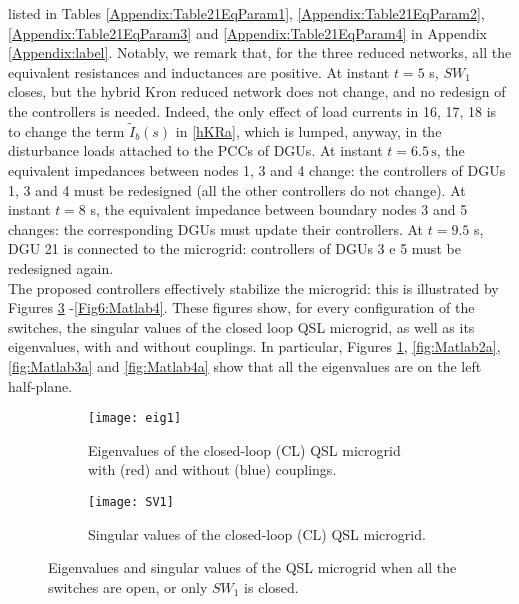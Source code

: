 \documentclass[a4paper]{article}
\theoremstyle{plain}
\begin{document}
listed in Tables \ref{Appendix:Table21EqParam1}, \ref{Appendix:Table21EqParam2}, \ref{Appendix:Table21EqParam3} and \ref{Appendix:Table21EqParam4} in Appendix \ref{Appendix:label}. Notably, we remark that, for the three reduced networks, all the equivalent resistances and inductances are positive.
At instant $t = 5$ s, $SW_1$ closes, but the hybrid Kron reduced network does not
change, and no redesign of the controllers is needed. Indeed, the only effect of load currents in 16, 17, 18 is to change the term $\tilde I_b(s)$ in \eqref{hKRa}, which is lumped, anyway, in the disturbance loads attached to the PCCs of DGUs. At instant $t =
6.5 \,\mbox{s}$, the equivalent impedances between nodes 1, 3 and 4 change: the
controllers of DGUs 1, 3 and 4 must be redesigned (all the other
controllers do not change). At instant $t = 8$ s, the equivalent
impedance between boundary nodes 3 and 5 changes: the corresponding
DGUs must update their controllers. At $t = 9.5$ s, DGU 21 is connected
to the microgrid: controllers of DGUs 3 e 5 must be redesigned
again.\\
	The proposed controllers effectively stabilize the microgrid:
        this is illustrated by Figures \ref{Fig6:Matlab1} -\ref{Fig6:Matlab4}. These figures show, for every
        configuration of the switches, the singular values of the
        closed loop QSL microgrid, as well as its eigenvalues, with
        and without couplings. In particular, Figures \ref{fig:Matlab1a}, \ref{fig:Matlab2a}, \ref{fig:Matlab3a} and \ref{fig:Matlab4a} show that all the eigenvalues are on the left half-plane.


        \begin{figure}[!htb]
                      \centering
                      \begin{subfigure}[!htb]{0.48\textwidth}
                        \centering
                        \texttt{[image: eig1]}
                        \caption{Eigenvalues of the closed-loop (CL) QSL microgrid with (red) and without (blue) couplings.}
                        \label{fig:Matlab1a}
                      \end{subfigure}
                      \begin{subfigure}[!htb]{0.48\textwidth}
                        \centering
                        \texttt{[image: SV1]}
                        \caption{Singular values of the closed-loop (CL) QSL microgrid.}
                        \label{fig:Matlab1b}
                      \end{subfigure}
		\caption{Eigenvalues and singular values of the QSL microgrid when all the switches are open, or only $SW_1$ is closed.}
		\label{Fig6:Matlab1}
                    \end{figure}
\end{document}
